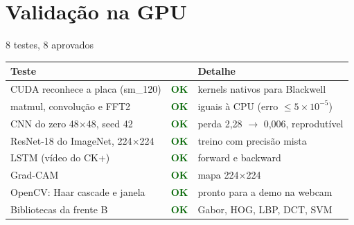 \documentclass[aspectratio=169,t,xcolor=table]{beamer}
\newcommand{\ok}{\textcolor{DarkGreen}{\textbf{OK}}}
\begin{document}
\section[INFBlue]{Validação na GPU}

\begin{frame}{8 testes, 8 aprovados}

    \begin{table}[]
        \centering
        \footnotesize
        \renewcommand{\arraystretch}{1.25}
        \setlength{\tabcolsep}{7pt}
        {
            \begin{tabular}{>{\raggedright\arraybackslash}p{4.9cm}>{\centering\arraybackslash}p{0.7cm}>{\raggedright\arraybackslash}p{4.9cm}}
                \toprule
                \textbf{Teste}                          & \textbf{}  & \textbf{Detalhe}                        \\
                \midrule
                CUDA reconhece a placa (sm\_120)         & \ok        & kernels nativos para Blackwell          \\
                matmul, convolução e FFT2                & \ok        & iguais à CPU (erro $\le 5\times10^{-5}$) \\
                CNN do zero 48$\times$48, seed 42        & \ok        & perda 2,28 $\rightarrow$ 0,006, reprodutível \\
                ResNet-18 do ImageNet, 224$\times$224    & \ok        & treino com precisão mista               \\
                LSTM (vídeo do CK+)                      & \ok        & forward e backward                      \\
                Grad-CAM                                 & \ok        & mapa 224$\times$224                     \\
                OpenCV: Haar cascade e janela            & \ok        & pronto para a demo na webcam            \\
                Bibliotecas da frente B                  & \ok        & Gabor, HOG, LBP, DCT, SVM               \\
                \bottomrule
            \end{tabular}
        }
    \end{table}

\end{frame}
\end{document}
